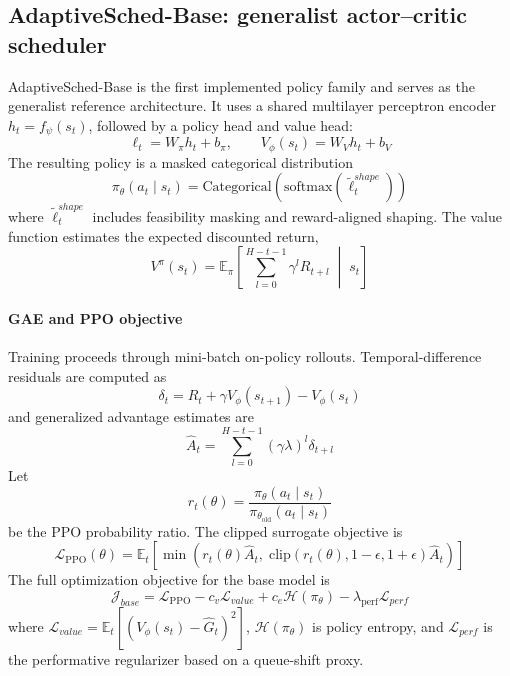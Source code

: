 \documentclass[journal]{IEEEtran}
\begin{document}
\subsection{AdaptiveSched-Base: generalist actor--critic scheduler}
AdaptiveSched-Base is the first implemented policy family and serves as the generalist reference architecture. It uses a shared multilayer perceptron encoder $h_t = f_\psi(s_t)$, followed by a policy head and value head:
\begin{equation}
\ell_t = W_\pi h_t + b_\pi,\qquad V_\phi(s_t) = W_V h_t + b_V
\end{equation}
The resulting policy is a masked categorical distribution
\begin{equation}
\pi_\theta(a_t \mid s_t) = \text{Categorical}(\text{softmax}(\tilde{\ell}^{shape}_t))
\end{equation}
where $\tilde{\ell}^{shape}_t$ includes feasibility masking and reward-aligned shaping. The value function estimates the expected discounted return,
\begin{equation}
V^\pi(s_t) = \mathbb{E}_\pi \left[\sum_{l=0}^{H-t-1}\gamma^l R_{t+l}\;\middle|\; s_t \right]
\end{equation}

\paragraph{GAE and PPO objective}
Training proceeds through mini-batch on-policy rollouts. Temporal-difference residuals are computed as
\begin{equation}
\delta_t = R_t + \gamma V_\phi(s_{t+1}) - V_\phi(s_t)
\end{equation}
and generalized advantage estimates are
\begin{equation}
\hat{A}_t = \sum_{l=0}^{H-t-1}(\gamma\lambda)^l \delta_{t+l}
\end{equation}
Let
\begin{equation}
r_t(\theta) = \frac{\pi_\theta(a_t\mid s_t)}{\pi_{\theta_{\text{old}}}(a_t\mid s_t)}
\end{equation}
be the PPO probability ratio. The clipped surrogate objective is
\begin{equation}
\mathcal{L}_{\text{PPO}}(\theta) =
\mathbb{E}_t\left[
\min\left(
r_t(\theta)\hat{A}_t,\;
\text{clip}(r_t(\theta),1-\epsilon,1+\epsilon)\hat{A}_t
\right)
\right]
\end{equation}
The full optimization objective for the base model is
\begin{equation}
\mathcal{J}_{base}
=
\mathcal{L}_{\text{PPO}}
- c_v \mathcal{L}_{value}
+ c_e \mathcal{H}(\pi_\theta)
- \lambda_{\text{perf}}\mathcal{L}_{perf}
\end{equation}
where $\mathcal{L}_{value}=\mathbb{E}_t[(V_\phi(s_t)-\hat{G}_t)^2]$, $\mathcal{H}(\pi_\theta)$ is policy entropy, and $\mathcal{L}_{perf}$ is the performative regularizer based on a queue-shift proxy.
\end{document}
